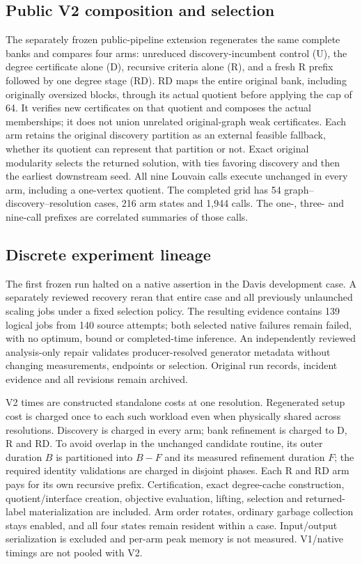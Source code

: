 \documentclass[sigconf,anonymous,review]{acmart}
\newcommand{\1}{\mathbf{1}}
\begin{document}
\subsection{Public V2 composition and selection}\label{app:public-v2-selection}
The separately frozen public-pipeline extension regenerates the same complete
banks and compares four arms: unreduced discovery-incumbent control (U), the
degree certificate alone (D), recursive criteria alone (R), and a fresh R prefix
followed by one degree stage (RD). RD maps the entire original bank, including
originally oversized blocks, through its actual quotient before applying the
cap of 64. It verifies new certificates on that quotient and composes the
actual memberships; it does not union unrelated original-graph weak
certificates. Each arm retains the original discovery partition as an external
feasible fallback, whether its quotient can represent that partition or not.
Exact original modularity selects the returned solution, with ties favoring
discovery and then the earliest downstream seed. All nine Louvain calls execute
unchanged in every arm, including a one-vertex quotient. The completed grid has
54 graph--discovery--resolution cases, 216 arm states and 1,944 calls.
The one-, three- and nine-call prefixes are correlated summaries of those calls.

\subsection{Discrete experiment lineage}
The first frozen run halted on a native assertion in the Davis development
case. A separately reviewed recovery reran that entire case and all previously
unlaunched scaling jobs under a fixed selection policy. The resulting evidence
contains 139 logical jobs from 140 source attempts; both selected native
failures remain failed, with no optimum, bound or completed-time inference.
An independently reviewed analysis-only repair validates producer-resolved
generator metadata without changing measurements, endpoints or selection.
Original run records, incident evidence and all revisions remain archived.

V2 times are constructed standalone costs at one resolution. Regenerated setup
cost is charged once to each such workload even when physically shared across
resolutions. Discovery is charged in every arm; bank refinement is charged to
D, R and RD. To avoid overlap in the unchanged candidate routine, its outer
duration $B$ is partitioned into $B-F$ and its measured refinement duration $F$;
the required identity validations are charged in disjoint phases.
Each R and RD arm pays for its own recursive prefix. Certification, exact
degree-cache construction, quotient/interface creation, objective evaluation,
lifting, selection and returned-label materialization are included. Arm order
rotates, ordinary garbage collection stays enabled, and all four states remain
resident within a case. Input/output serialization is excluded and per-arm peak
memory is not measured. V1/native timings are not pooled with V2.
\end{document}
